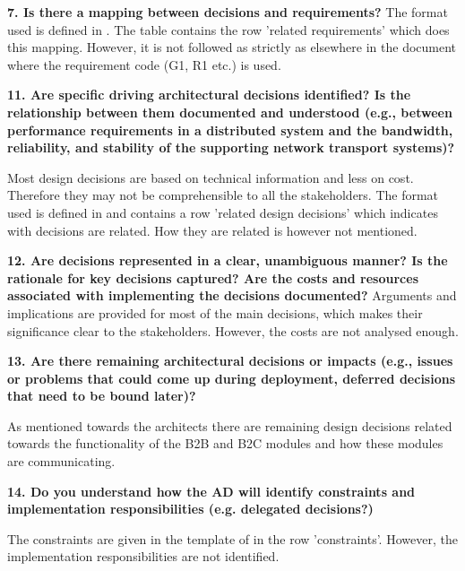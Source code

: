 \vspace{.5cm}
\textbf{7. Is there a mapping between decisions and requirements?}
The format used is defined in \cite{tyree}. The table contains the row 'related requirements' which does this mapping. However, it is not followed as strictly as elsewhere in the document where the requirement code (G1, R1 etc.) is used.

\vspace{.5cm}
\textbf{11. Are specific driving architectural decisions identified? Is the relationship between them documented and understood (e.g., between performance requirements in a distributed system and the bandwidth, reliability, and stability of the supporting network transport systems)?}

Most design decisions are based on technical information and less on cost. Therefore they may not be comprehensible to all the stakeholders. The format used is defined in \cite{tyree} and contains a row 'related design decisions' which indicates with decisions are related. How they are related is however not mentioned.

\vspace{.5cm}
\textbf{12. Are decisions represented in a clear, unambiguous manner? Is the rationale for key decisions captured? Are the costs and resources associated with implementing the decisions documented?}
Arguments and implications are provided for most of the main decisions, which makes their significance clear to the stakeholders. However, the costs are not analysed enough.

\vspace{.5cm}
\textbf{13. Are there remaining architectural decisions or impacts (e.g., issues or problems that could come up during deployment, deferred decisions that need to be bound later)?}

As mentioned towards the architects there are remaining design decisions related towards the functionality of the B2B and B2C modules and how these modules are communicating.

\vspace{.5cm}
\textbf{14. Do you understand how the AD will identify constraints and implementation responsibilities (e.g. delegated decisions?)}

The constraints are given in the template of \cite{clemens} in the row 'constraints'. However, the implementation responsibilities are not identified.
